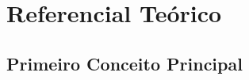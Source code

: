 \chapter{Referencial Teórico}
\label{cap-referencial-teorico}


\section{Primeiro Conceito Principal}
\label{rt-conceito1}




